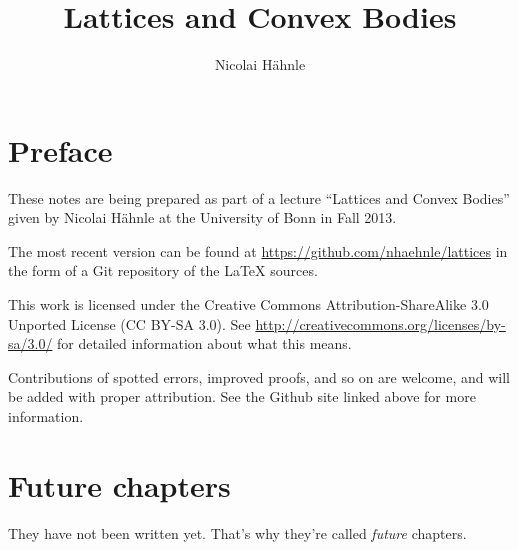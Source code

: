 \documentclass[a4paper,10pt]{scrbook}
\title{Lattices and Convex Bodies}
\author{Nicolai Hähnle}
\theoremstyle{plain}
\theoremstyle{definition}
\begin{document}
\maketitle

\tableofcontents

\chapter*{Preface}

These notes are being prepared as part of a lecture ``Lattices and Convex Bodies''
given by Nicolai Hähnle at the University of Bonn in Fall 2013.

The most recent version can be found at \url{https://github.com/nhaehnle/lattices}
in the form of a Git repository of the \LaTeX{} sources.

This work is licensed under the Creative Commons Attribution-ShareAlike 3.0
Unported License (CC BY-SA 3.0). See \url{http://creativecommons.org/licenses/by-sa/3.0/}
for detailed information about what this means.

Contributions of spotted errors, improved proofs, and so on are welcome,
and will be added with proper attribution.
See the Github site linked above for more information.









\chapter{Future chapters}
\label{chapter:not-yet}

They have not been written yet. That's why they're called \emph{future} chapters.





\end{document}
